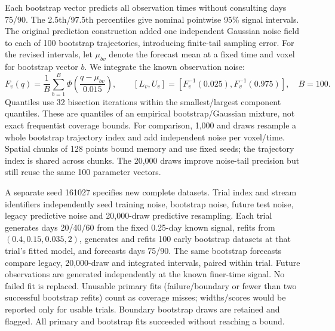 Each bootstrap vector predicts all observation times without consulting days 75/90. The 2.5th/97.5th percentiles give nominal pointwise 95\% signal intervals. The original prediction construction added one independent Gaussian noise field to each of 100 bootstrap trajectories, introducing finite-tail sampling error. For the revised intervals, let $\mu_{bv}$ denote the forecast mean at a fixed time and voxel for bootstrap vector $b$. We integrate the known observation noise:
\begin{equation}
 F_v(q)=\frac{1}{B}\sum_{b=1}^{B}\Phi\!\left(\frac{q-\mu_{bv}}{0.015}\right),\qquad
 [L_v,U_v]=[F_v^{-1}(0.025),F_v^{-1}(0.975)],\quad B=100.
\end{equation}
Quantiles use 32 bisection iterations within the smallest/largest component quantiles. These are quantiles of an empirical bootstrap/Gaussian mixture, not exact frequentist coverage bounds. For comparison, 1,000 and \PPDraws{} draws resample a whole bootstrap trajectory index and add independent noise per voxel/time. Spatial chunks of 128 points bound memory and use fixed seeds; the trajectory index is shared across chunks. The 20,000 draws improve noise-tail precision but still reuse the same 100 parameter vectors.

A separate seed 161027 specifies \PPTrials{} new complete datasets. Trial index and stream identifiers independently seed training noise, bootstrap noise, future test noise, legacy predictive noise and 20,000-draw predictive resampling. Each trial generates days 20/40/60 from the fixed 0.25-day known signal, refits from $(0.4,0.15,0.035,2)$, generates and refits 100 early bootstrap datasets at that trial's fitted model, and forecasts days 75/90. The same bootstrap forecasts compare legacy, 20,000-draw and integrated intervals, paired within trial. Future observations are generated independently at the known finer-time signal. No failed fit is replaced. Unusable primary fits (failure/boundary or fewer than two successful bootstrap refits) count as coverage misses; widths/scores would be reported only for usable trials. Boundary bootstrap draws are retained and flagged. All \PPTrials{} primary and \PPNestedFits{} bootstrap fits succeeded without reaching a bound.

